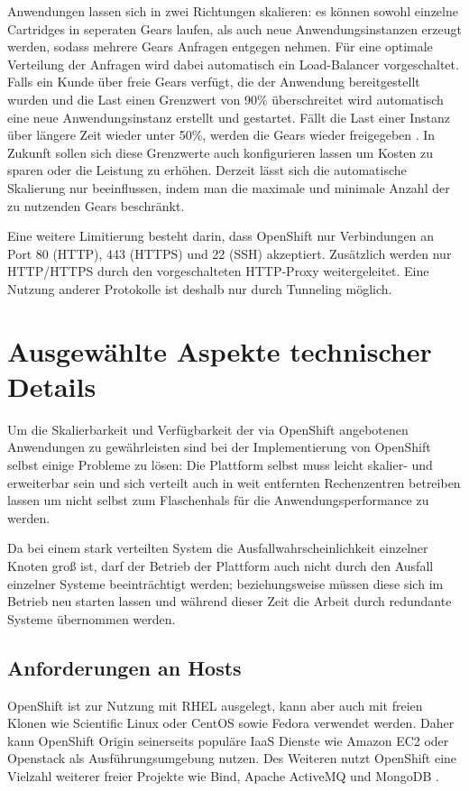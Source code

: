 \documentclass[10pt,a4paper,compsoc]{IEEEtran}
\begin{document}
Anwendungen lassen sich in zwei Richtungen skalieren: es können sowohl einzelne Cartridges in seperaten Gears laufen, als auch neue Anwendungsinstanzen erzeugt werden, sodass mehrere Gears Anfragen entgegen nehmen. Für eine optimale Verteilung der Anfragen wird dabei automatisch ein Load-Balancer vorgeschaltet. Falls ein Kunde über freie Gears verfügt, die der Anwendung bereitgestellt wurden und die Last einen Grenzwert von 90\% überschreitet wird automatisch eine neue Anwendungsinstanz erstellt und gestartet. Fällt die Last einer Instanz über längere Zeit wieder unter 50\%, werden die Gears wieder freigegeben \cite{os_scaling}. In Zukunft sollen sich diese Grenzwerte auch konfigurieren lassen um Kosten zu sparen oder die Leistung zu erhöhen. Derzeit lässt sich die automatische Skalierung nur beeinflussen, indem man die maximale und minimale Anzahl der zu nutzenden Gears beschränkt.

Eine weitere Limitierung besteht darin, dass OpenShift nur Verbindungen an Port 80 (HTTP), 443 (HTTPS) und 22 (SSH) akzeptiert. Zusätzlich werden nur HTTP/HTTPS durch den vorgeschalteten HTTP-Proxy weitergeleitet. Eine Nutzung anderer Protokolle ist deshalb nur durch Tunneling möglich.

\section{Ausgewählte Aspekte technischer Details}
\label{sec:tech}
Um die Skalierbarkeit und Verfügbarkeit der via OpenShift angebotenen Anwendungen zu gewährleisten sind bei der Implementierung von OpenShift selbst einige Probleme zu lösen: Die Plattform selbst muss leicht skalier- und erweiterbar sein und sich verteilt auch in weit entfernten Rechenzentren betreiben lassen um nicht selbst zum Flaschenhals für die Anwendungsperformance zu werden.

Da bei einem stark verteilten System die Aus\-fall\-wahr\-schein\-lich\-keit einzelner Knoten groß ist, darf der Betrieb der Plattform auch nicht durch den Ausfall einzelner Systeme beeinträchtigt werden; beziehungsweise müssen diese sich im Betrieb neu starten lassen und während dieser Zeit die Arbeit durch redundante Systeme übernommen werden.

\subsection{Anforderungen an Hosts}
OpenShift ist zur Nutzung mit RHEL ausgelegt, kann aber auch mit freien Klonen wie Scientific Linux oder CentOS sowie Fedora verwendet werden. Daher kann OpenShift Origin seinerseits populäre IaaS Dienste wie Amazon EC2 oder Openstack als Ausführungsumgebung nutzen. Des Weiteren nutzt OpenShift eine Vielzahl weiterer freier Projekte wie Bind, Apache ActiveMQ und MongoDB \cite[3.1]{os_buildyourown}.
\end{document}
